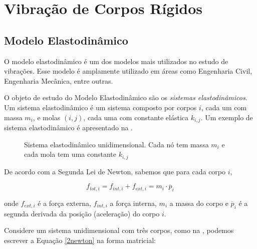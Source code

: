 \section{Vibração de Corpos Rígidos}

\subsection{Modelo Elastodinâmico}
O modelo elastodinâmico \cite{shabana2012theory} é um dos modelos mais utilizados no estudo de vibrações. Esse modelo é amplamente utilizado em áreas como Engenharia Civil, Engenharia Mecânica, entre outras. 

O objeto de estudo do Modelo Elastodinâmico são os \emph{sistemas elastodinâmicos}. Um sistema elastodinâmico é um sistema composto por corpos $i$, cada um com massa $m_i$, e molas $(i,j)$, cada uma com constante elástica $k_{i,j}$. Um exemplo de sistema elastodinâmico é apresentado na .

\begin{figure}[ht]
	\centering
	
	\caption[Sistema elastodinâmico unidimensional]{Sistema elastodinâmico unidimensional. Cada nó tem massa $m_i$ e cada mola tem uma constante $k_{i,j}$}\label{1dbodysystem}
\end{figure}

De acordo com a Segunda Lei de Newton, sabemos que para cada corpo $i$,

\begin{equation}
f_{tot,i} = f_{int,i} + f_{ext, i} = m_i \cdot \ddot{p_i}
\label{2newton}
\end{equation}

onde $f_{ext,i}$ é a força externa,  $f_{int,i}$ a força interna, $m_i$ a massa do corpo e $\ddot{p_i}$ é a segunda derivada da posição (aceleração) do corpo $i$.  

Considere um sistema unidimensional com três corpos, como na , podemos escrever a Equação \eqref{2newton} na forma matricial:

